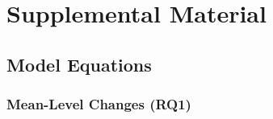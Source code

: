 \documentclass[
  english,
  man,floatsintext]{apa7}
\begin{document}
\endgroup

\newpage

\hypertarget{appendix-appendix}{%
\appendix}


\renewcommand{\appendixname}{\textcolor{white}{.}}

\hypertarget{supplemental-material}{%
\section{Supplemental Material}\label{supplemental-material}}

\renewcommand{\thefigure}{S\arabic{figure}} \setcounter{figure}{0}
\renewcommand{\thetable}{S\arabic{table}} \setcounter{table}{0}

\setcounter{page}{1}

\hypertarget{model-equations}{%
\subsection{Model Equations}\label{model-equations}}

\hypertarget{mean-level-changes-rq1}{%
\subsubsection{Mean-Level Changes (RQ1)}\label{mean-level-changes-rq1}}
\end{document}
